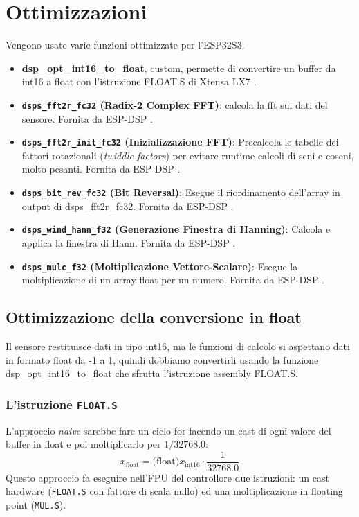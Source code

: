 \section{Ottimizzazioni}
Vengono usate varie funzioni ottimizzate per l'ESP32S3.
\begin{itemize}
	\item \textbf{dsp\_opt\_int16\_to\_float}, custom, permette di convertire un buffer da int16
	a float con l'istruzione FLOAT.S di Xtensa LX7 \cite{xtensa_isa}.
	 \item \textbf{\texttt{dsps\_fft2r\_fc32} (Radix-2 Complex FFT)}: calcola la fft sui dati del sensore. Fornita da ESP-DSP \cite{espdsp}.
	\item \textbf{\texttt{dsps\_fft2r\_init\_fc32} (Inizializzazione FFT)}: Precalcola le tabelle dei fattori rotazionali (\textit{twiddle factors}) per evitare runtime calcoli di seni e coseni, molto pesanti. Fornita da ESP-DSP \cite{espdsp}.
	\item \textbf{\texttt{dsps\_bit\_rev\_fc32} (Bit Reversal)}: Esegue il riordinamento dell'array in output di dsps\_fft2r\_fc32. Fornita da ESP-DSP \cite{espdsp}.
	\item \textbf{\texttt{dsps\_wind\_hann\_f32} (Generazione Finestra di Hanning)}: Calcola e applica la finestra di Hann. Fornita da ESP-DSP \cite{espdsp}.
	\item \textbf{\texttt{dsps\_mulc\_f32} (Moltiplicazione Vettore-Scalare)}: Esegue la moltiplicazione di un array float per un numero. Fornita da ESP-DSP \cite{espdsp}.
\end{itemize}


\subsection{Ottimizzazione della conversione in float}
\label{subsec:dsp_optimization}
Il sensore restituisce dati in tipo int16, ma le funzioni di calcolo si aspettano dati in formato float da -1 a 1, quindi dobbiamo convertirli usando la funzione dsp\_opt\_int16\_to\_float che sfrutta l'istruzione assembly FLOAT.S.

\subsubsection{L'istruzione \texttt{FLOAT.S}}
L'approccio \textit{naive} sarebbe fare un ciclo for facendo un cast di ogni valore del buffer in float e poi moltiplicarlo per $1/32768.0$:
\begin{equation}
	x_{\text{float}} = \text{(float)}x_{\text{int16}} \cdot \frac{1}{32768.0}
\end{equation}
Questo approccio fa eseguire nell'FPU del controllore due istruzioni: un cast hardware (\texttt{FLOAT.S} con fattore di scala nullo) ed una moltiplicazione in floating point (\texttt{MUL.S}).


